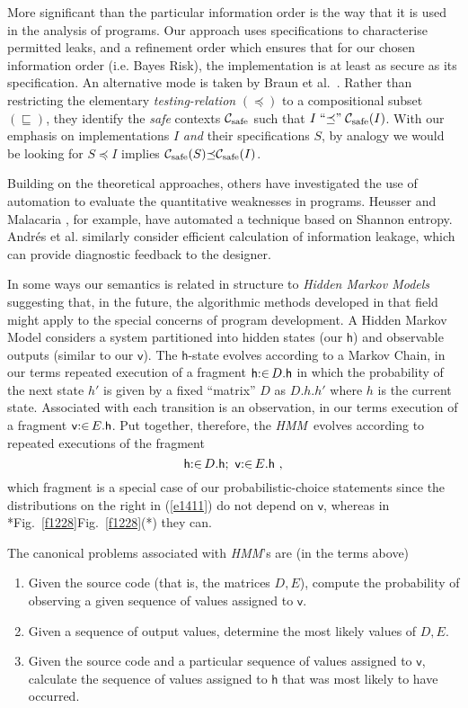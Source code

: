\documentclass[runningheads]{llncs}
\newcommand\Vh {\mathsf{h}}
\newcommand\Vv {\mathsf{v}}
\newcommand\Eqn[1] {(\ref{#1})}
\newcommand\CC {{\cal C}}
\newcommand\HMM {\textit{HMM}}
\newcommand\Ref {\mathrel{\sqsubseteq}}
\newcommand\ERef {\mathrel{\preceq}}
\newcommand\Fig[2][*] {{\def\z{#1}\if*\z Fig.~\ref{#2}\else Fig.~\ref{#2}(#1)\fi}}
\begin{document}
More significant than the particular information order is the way that it is used in the analysis of programs. Our approach uses specifications to characterise permitted leaks, and a refinement order which ensures that for our chosen information order (i.e. Bayes Risk), the implementation is at least as secure as its specification. An alternative mode is taken by Braun et al.\ \cite{Braun:08}. Rather than restricting  the elementary \emph{testing-relation} $(\ERef)$ to a compositional subset $(\Ref)$, they identify the  \emph{safe} contexts $\CC_{\rm safe}$ such that $I\mathrel{\mbox{``$\ERef$''}}\CC_{\rm safe}(I)$. With our emphasis on implementations $I$ \emph{and} their specifications $S$, by analogy we would be looking for $S{\ERef}I$ implies $\CC_{\rm safe}(S){\ERef}\CC_{\rm safe}(I)$.

Building on the theoretical approaches, others have investigated the use of automation to evaluate the quantitative weaknesses in programs. Heusser and Malacaria \cite{Heusser:10}, for example, have automated a technique based on Shannon entropy. Andr{\'e}s et al. \cite{Andres:10} similarly consider efficient calculation of information leakage, which can provide diagnostic feedback to the designer.

In some ways our semantics is related in structure to \emph{Hidden Markov Models} \cite{Jurafsky:00} suggesting that, in the future, the algorithmic methods developed in that field might apply to the special concerns of program development. A Hidden Markov Model considers a system partitioned into hidden states (our $\Vh$) and observable outputs (similar to our $\Vv$). The $\Vh$-state evolves according to a Markov Chain, in our terms repeated execution of a fragment $\Vh\From D.\Vh$ in which the probability of the next state $h'$ is given by a fixed ``matrix'' $D$ as $D.h.h'$ where $h$ is the current state. Associated with each transition is an observation, in our terms execution of a fragment $\Vv\From E.\Vh$. Put together, therefore, the \HMM\ evolves according to repeated executions of the fragment
\begin{equation}\label{e1411}
 \Vh\From D.\Vh;~\Vv\From E.\Vh ~,
\end{equation}
which fragment is a special case of our probabilistic-choice statements since the distributions on the right in \Eqn{e1411} do not depend on $\Vv$, whereas in \Fig{f1228} they can.

The canonical problems associated with \HMM's are (in the terms above)
\begin{enumerate}
\item Given the source code (that is, the matrices $D,E$), compute the probability of observing a given sequence of values assigned to $\Vv$.
\item Given a sequence of output values, determine the most likely values of $D,E$.
\item Given the source code and a particular sequence of values assigned to $\Vv$, calculate the sequence of values assigned to $\Vh$ that was most likely to have occurred.
\end{enumerate}
\end{document}
